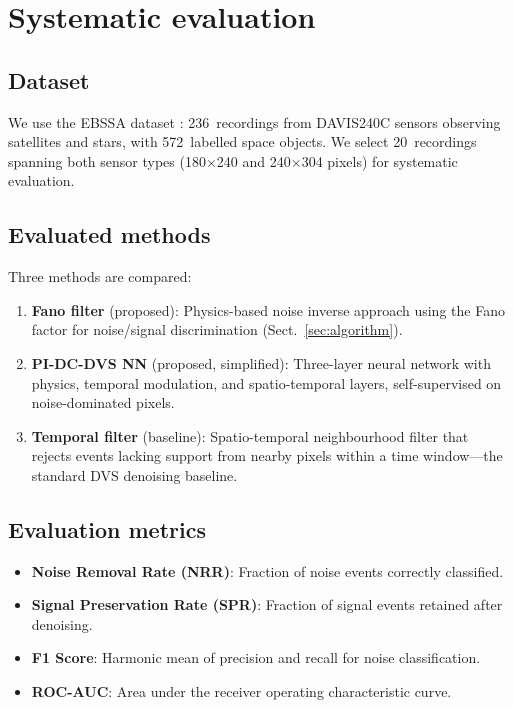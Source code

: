 \documentclass[twocolumn]{article}
\begin{document}
\section{Systematic evaluation}
\label{sec:evaluation}

\subsection{Dataset}

We use the EBSSA dataset \citep{C1}: 236~recordings from DAVIS240C sensors observing satellites and stars, with 572~labelled space objects.
We select 20~recordings spanning both sensor types (180$\times$240 and 240$\times$304 pixels) for systematic evaluation.

\subsection{Evaluated methods}

Three methods are compared:
\begin{enumerate}
  \item \textbf{Fano filter} (proposed): Physics-based noise inverse approach using the Fano factor for noise/signal discrimination (Sect.~\ref{sec:algorithm}).
  \item \textbf{PI-DC-DVS NN} (proposed, simplified): Three-layer neural network with physics, temporal modulation, and spatio-temporal layers, self-supervised on noise-dominated pixels.
  \item \textbf{Temporal filter} (baseline): Spatio-temporal neighbourhood filter \citep{B1} that rejects events lacking support from nearby pixels within a time window---the standard DVS denoising baseline.
\end{enumerate}

\subsection{Evaluation metrics}

\begin{itemize}
  \item \textbf{Noise Removal Rate (NRR)}: Fraction of noise events correctly classified.
  \item \textbf{Signal Preservation Rate (SPR)}: Fraction of signal events retained after denoising.
  \item \textbf{F1 Score}: Harmonic mean of precision and recall for noise classification.
  \item \textbf{ROC-AUC}: Area under the receiver operating characteristic curve.
\end{itemize}
\end{document}
